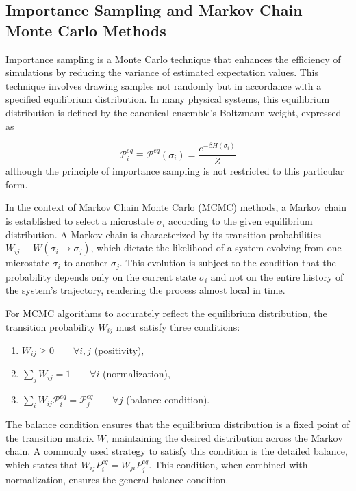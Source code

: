 \subsection{Importance Sampling and Markov Chain Monte Carlo Methods}

Importance sampling is a Monte Carlo technique that enhances the efficiency of
simulations by reducing the variance of estimated expectation values. This
technique involves drawing samples not randomly but in accordance with a
specified equilibrium distribution. In many physical systems, this equilibrium
distribution is defined by the canonical ensemble's Boltzmann weight, expressed
as 

\begin{equation}
    \mathcal{P}^{eq}_i \equiv \mathcal{P}^{eq}(\sigma_i) = \frac{e^{-\beta H(\sigma_i)}}{Z}
\end{equation}
although the principle of importance sampling is not restricted to this
particular form.

In the context of Markov Chain Monte Carlo (MCMC) methods, a Markov chain is
established to select a microstate \( \sigma_i \) according to the given
equilibrium distribution. A Markov chain is characterized by its transition
probabilities \( W_{ij} \equiv W(\sigma_i \rightarrow \sigma_j) \), which
dictate the likelihood of a system evolving from one microstate \( \sigma_i \)
to another \( \sigma_j \). This evolution is subject to the condition that the
probability depends only on the current state \( \sigma_i \) and not on the
entire history of the system's trajectory, rendering the process almost local in
time.

For MCMC algorithms to accurately reflect the equilibrium distribution, the
transition probability \( W_{ij} \) must satisfy three conditions:

\begin{enumerate}
    \item \( W_{ij} \geq 0 \qquad \forall i, j \) (positivity),
    \item \( \sum_j W_{ij} = 1  \qquad \forall i \) (normalization),
    \item \( \sum_i W_{ij} \mathcal{P}^{eq}_i = \mathcal{P}^{eq}_j \qquad
    \forall j \) (balance condition).
\end{enumerate}

The balance condition ensures that the equilibrium distribution is a fixed point
of the transition matrix \( W \), maintaining the desired distribution across
the Markov chain. A commonly used strategy to satisfy this condition is the
detailed balance, which states that \( W_{ij} P^{eq}_i = W_{ji} P^{eq}_j \).
This condition, when combined with normalization, ensures the general balance
condition.


